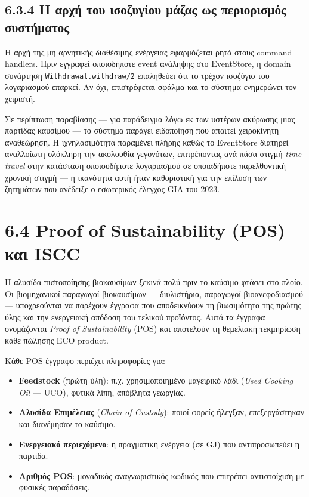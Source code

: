 \subsection{6.3.4 Η αρχή του ισοζυγίου μάζας ως περιορισμός
συστήματος}\label{ux3b7-ux3b1ux3c1ux3c7ux3ae-ux3c4ux3bfux3c5-ux3b9ux3c3ux3bfux3b6ux3c5ux3b3ux3afux3bfux3c5-ux3bcux3acux3b6ux3b1ux3c2-ux3c9ux3c2-ux3c0ux3b5ux3c1ux3b9ux3bfux3c1ux3b9ux3c3ux3bcux3ccux3c2-ux3c3ux3c5ux3c3ux3c4ux3aeux3bcux3b1ux3c4ux3bfux3c2}

Η αρχή της μη αρνητικής διαθέσιμης ενέργειας εφαρμόζεται ρητά στους
command handlers. Πριν εγγραφεί οποιοδήποτε event ανάληψης στο
EventStore, η domain συνάρτηση \texttt{Withdrawal.withdraw/2} επαληθεύει
ότι το τρέχον ισοζύγιο του λογαριασμού επαρκεί. Αν όχι, επιστρέφεται
σφάλμα και το σύστημα ενημερώνει τον χειριστή.

Σε περίπτωση παραβίασης --- για παράδειγμα λόγω εκ των υστέρων ακύρωσης
μιας παρτίδας καυσίμου --- το σύστημα παράγει ειδοποίηση που απαιτεί
χειροκίνητη αναθεώρηση. Η ιχνηλασιμότητα παραμένει πλήρης καθώς το
EventStore διατηρεί αναλλοίωτη ολόκληρη την ακολουθία γεγονότων,
επιτρέποντας ανά πάσα στιγμή \emph{time travel} στην κατάσταση
οποιουδήποτε λογαριασμού σε οποιαδήποτε παρελθοντική χρονική στιγμή ---
η ικανότητα αυτή ήταν καθοριστική για την επίλυση των ζητημάτων που
ανέδειξε ο εσωτερικός έλεγχος GIA του 2023.

\section{6.4 Proof of Sustainability (POS) και
ISCC}\label{proof-of-sustainability-pos-ux3baux3b1ux3b9-iscc}

Η αλυσίδα πιστοποίησης βιοκαυσίμων ξεκινά πολύ πριν το καύσιμο φτάσει
στο πλοίο. Οι βιομηχανικοί παραγωγοί βιοκαυσίμων --- διυλιστήρια,
παραγωγοί βιοανεφοδιασμού --- υποχρεούνται να παρέχουν έγγραφα που
αποδεικνύουν τη βιωσιμότητα της πρώτης ύλης και την ενεργειακή απόδοση
του τελικού προϊόντος. Αυτά τα έγγραφα ονομάζονται \emph{Proof of
Sustainability} (POS) και αποτελούν τη θεμελιακή τεκμηρίωση κάθε πώλησης
ECO product.

Κάθε POS έγγραφο περιέχει πληροφορίες για:

\begin{itemize}
\tightlist
\item
  \textbf{Feedstock} (πρώτη ύλη): π.χ. χρησιμοποιημένο μαγειρικό λάδι
  (\emph{Used Cooking Oil} --- UCO), φυτικά λίπη, απόβλητα γεωργίας.
\item
  \textbf{Αλυσίδα Επιμέλειας} (\emph{Chain of Custody}): ποιοί φορείς
  ήλεγξαν, επεξεργάστηκαν και διανέμησαν το καύσιμο.
\item
  \textbf{Ενεργειακό περιεχόμενο}: η πραγματική ενέργεια (σε GJ) που
  αντιπροσωπεύει η παρτίδα.
\item
  \textbf{Αριθμός POS}: μοναδικός αναγνωριστικός κωδικός που επιτρέπει
  αντιστοίχιση με φυσικές παραδόσεις.
\end{itemize}

